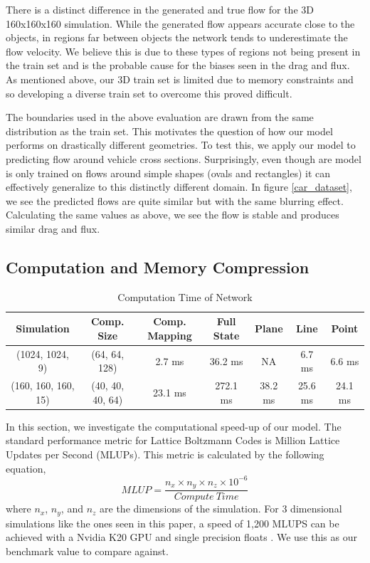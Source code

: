 \documentclass{article}
\begin{document}
There is a distinct difference in the generated and true flow for the 3D 160x160x160 simulation. While the generated flow appears accurate close to the objects, in regions far between objects the network tends to underestimate the flow velocity. We believe this is due to these types of regions not being present in the train set and is the probable cause for the biases seen in the drag and flux. As mentioned above, our 3D train set is limited due to memory constraints and so developing a diverse train set to overcome this proved difficult.

The boundaries used in the above evaluation are drawn from the same distribution as the train set. This motivates the question of how our model performs on drastically different geometries. To test this, we apply our model to predicting flow around vehicle cross sections. Surprisingly, even though are model is only trained on flows around simple shapes (ovals and rectangles) it can effectively generalize to this distinctly different domain. In figure \ref{car_dataset}, we see the predicted flows are quite similar but with the same blurring effect. Calculating the same values as above, we see the flow is stable and produces similar drag and flux.

\subsection{Computation and Memory Compression}

\begin{table}[]
\small
\caption{Computation Time of Network} \label{compute_times}
\centering
\begin{tabular}{|c|cccccc|}
\hline
Simulation    & Comp. Size       & Comp. Mapping       & Full State  & Plane      & Line       & Point \\ \hline
(1024, 1024, 9)  & (64, 64, 128)                 & 2.7 ms            & 36.2 ms   & NA         & 6.7 ms   & 6.6 ms \\
(160, 160, 160, 15) & (40, 40, 40, 64)                 & 23.1 ms           & 272.1 ms  & 38.2 ms  & 25.6 ms  & 24.1 ms  
\\ \hline
\end{tabular}
\label{computation_table}
\end{table}


In this section, we investigate the computational speed-up of our model. The standard performance metric for Lattice Boltzmann Codes is Million Lattice Updates per Second (MLUPs). This metric is calculated by the following equation,
\begin{equation}
  MLUP = \frac{n_x \times n_y \times n_z \times 10^{-6}}{Compute \ Time}
\end{equation}
 where $n_x$, $n_y$, and $n_z$ are the dimensions of the simulation. For 3 dimensional simulations like the ones seen in this paper, a speed of 1,200 MLUPS can be achieved with a Nvidia K20 GPU and single precision floats \cite{januszewski2014sailfish}. We use this as our benchmark value to compare against.
\end{document}
